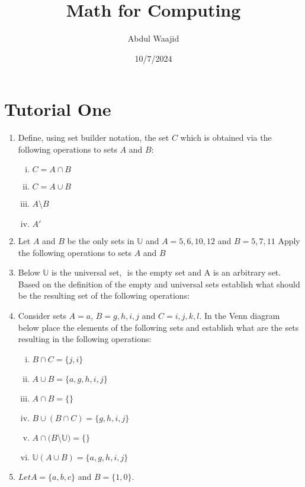\documentclass[]{article}
\title{Math for Computing}
\author{Abdul Waajid}
\date{10/7/2024}
\begin{document}
\maketitle

\section{Tutorial One}

\begin{enumerate}

    \item Define, using set builder notation, the set $C$ which is obtained via the following operations to sets $A$ and $B$:
    \begin{enumerate}[i.]
        \item $C = A \cap B$ 
        \item $C = A \cup B$
        \item $A$\textbackslash $B$ 
        \item $A'$  
    \end{enumerate}

    \item Let $A$ and $B$ be the only sets in $\mathbb{U}$ and $A = {5, 6, 10, 12}$ and $B = {5, 7, 11}$ Apply the following operations to sets $A$ and $B$


    \item Below $\mathbb{U}$ is the universal set, ${}$ is the empty set and A is an arbitrary set. Based on the definition of the empty and universal sets establish what should be the resulting set of the following operations:
        

    \item Consider sets $A = {a}$, $B = {g, h, i, j}$ and $C = {i, j, k, l}$. In the Venn diagram below place the elements of the following sets and establish what are the sets resulting in the following operations:

    \begin{enumerate}[i.]
        \item $B \cap C = \{j, i\} $
        \item $A \cup B = \{a, g, h, i, j\}$
        \item $A \cap B = \{ \}$
        \item $B \cup (B \cap C) = \{g, h, i, j\}$
        \item $A \cap (B$\textbackslash$ \mathbb{U}) = \{ \}$
        \item $\mathbb{U}(A\cup B) = \{a, g, h, i, j\}$
    \end{enumerate}
    \item $Let A = \{a, b, c\}$ and $B = \{1, 0\}.$
        

\end{enumerate}
\end{document}
